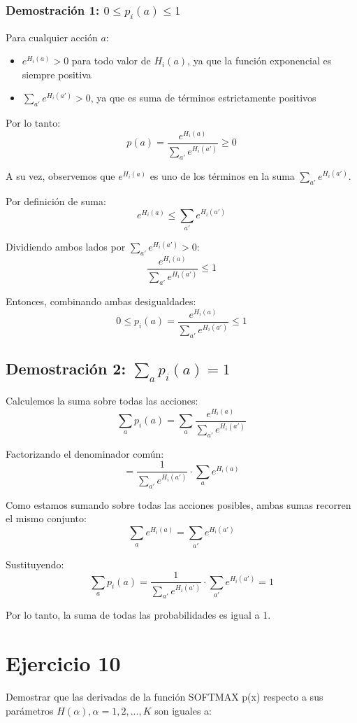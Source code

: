 \documentclass[12pt,a4paper]{article}
\begin{document}
\subsubsection{Demostración 1: $0 \leq p_i(a) \leq 1$}

Para cualquier acción $a$:
\begin{itemize}
    \item $e^{H_i(a)} > 0$ para todo valor de $H_i(a)$, ya que la función exponencial es siempre positiva
    \item $\sum_{a'} e^{H_i(a')} > 0$, ya que es suma de términos estrictamente positivos
\end{itemize}

Por lo tanto:
$$p(a) = \frac{e^{H_i(a)}}{\sum_{a'} e^{H_i(a')}} \geq 0$$

A su vez, observemos que $e^{H_i(a)}$ es uno de los términos en la suma $\sum_{a'} e^{H_i(a')}$.

Por definición de suma:
$$e^{H_i(a)} \leq \sum_{a'} e^{H_i(a')}$$

Dividiendo ambos lados por $\sum_{a'} e^{H_i(a')} > 0$:
$$\frac{e^{H_i(a)}}{\sum_{a'} e^{H_i(a')}} \leq 1$$

Entonces, combinando ambas desigualdades:
$$0 \leq p_i(a) = \frac{e^{H_i(a)}}{\sum_{a'} e^{H_i(a')}} \leq 1$$

\subsection{Demostración 2: $\sum_{a} p_i(a) = 1$}

Calculemos la suma sobre todas las acciones:
$$\sum_{a} p_i(a) = \sum_{a} \frac{e^{H_i(a)}}{\sum_{a'} e^{H_i(a')}}$$

Factorizando el denominador común:
$$= \frac{1}{\sum_{a'} e^{H_i(a')}} \cdot \sum_{a} e^{H_i(a)}$$

Como estamos sumando sobre todas las acciones posibles, ambas sumas recorren el mismo conjunto:
$$\sum_{a} e^{H_i(a)} = \sum_{a'} e^{H_i(a')}$$

Sustituyendo:
$$\sum_{a} p_i(a) = \frac{1}{\sum_{a'} e^{H_i(a')}} \cdot \sum_{a'} e^{H_i(a')} = 1$$

Por lo tanto, la suma de todas las probabilidades es igual a 1.

\section{Ejercicio 10}

Demostrar que las derivadas de la función SOFTMAX p(x) respecto a sus parámetros
$H(\alpha), \alpha = 1,2,...,K$ son iguales a:
\end{document}
